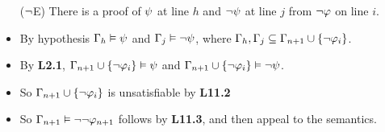 \documentclass[a4paper, 11pt]{article} %
\begin{document}
\begin{itemize}
  \item[($\neg$E)] There is a proof of $\psi$ at line $h$ and $\neg\psi$ at line $j$ from $\neg \varphi$ on line $i$.
    \item By hypothesis $\Gamma_h\vDash \psi$ and $\Gamma_j\vDash\neg\psi$, where $\Gamma_h,\Gamma_j\subseteq\Gamma_{n+1}\cup\lbrace\neg \varphi_i\rbrace$.
    \item By \textbf{L2.1}, $\Gamma_{n+1}\cup\lbrace\neg \varphi_i\rbrace\vDash\psi$ and $\Gamma_{n+1}\cup\lbrace\neg \varphi_i\rbrace\vDash\neg\psi$.
    \item So $\Gamma_{n+1}\cup\lbrace\neg \varphi_i\rbrace$ is unsatisfiable by \textbf{L11.2}
    \item So $\Gamma_{n+1}\vDash \neg\neg\varphi_{n+1}$ follows by \textbf{L11.3}, and then appeal to the semantics.

\end{itemize}
\end{document}
